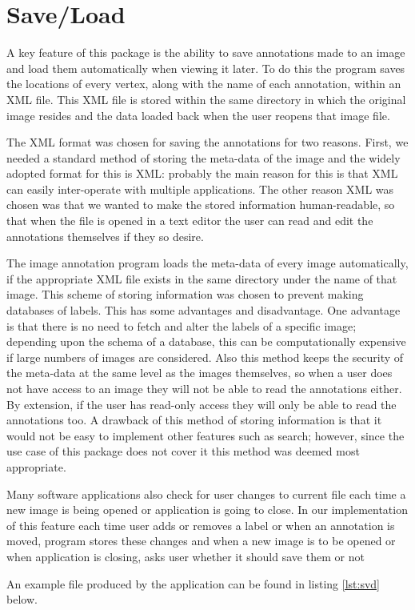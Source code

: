 \section{Save\slash Load}
A key feature of this package is the ability to save annotations made to an image and load them automatically when viewing it later. To do this the program saves the locations of every vertex, along with the name of each annotation, within an XML file.  This XML file is stored within the same directory in which the original image resides and the data loaded back when the user reopens that image file.

The XML format was chosen for saving the annotations for two reasons. First, we needed a standard method of storing the meta-data of the image and the widely adopted format for this is XML: probably the main reason for this is that XML can easily inter-operate with multiple applications.  The other reason XML was chosen was that we wanted to make the stored information human-readable, so that when the file is opened in a text editor the user can read and edit the annotations themselves if they so desire.

The image annotation program loads the meta-data of every image automatically, if the appropriate XML file exists in the same directory under the name of that image. This scheme of storing information was chosen to prevent making databases of labels. This has some advantages and disadvantage. One advantage is that there is no need to fetch and alter the labels of a specific image; depending upon the schema of a database, this can be computationally expensive if large numbers of images are considered. Also this method keeps the security of the meta-data at the same level as the images themselves, so when a user does not have access to an image they will not be able to read the annotations either.  By extension, if the user has read-only access they will only be able to read the annotations too. A drawback of this method of storing information is that it would not be easy to implement other features such as search; however, since the use case of this package does not cover it this method was deemed most appropriate.

Many software applications also check for user changes to current file each time a new image is being opened or application is going to close. In our implementation of this feature each time user adds or removes a label or when an annotation is moved, program stores these changes and when a new image is to be opened or when application is closing, asks user whether it should save them or not 

An example file produced by the application can be found in listing \ref{lst:svd} below.    

\begin{center}
\lstset{language=XML, basicstyle=\footnotesize\ttfamily, caption=XML file used to store image labels,frame=single,captionpos=b,label=lst:svd}

\end{center}

